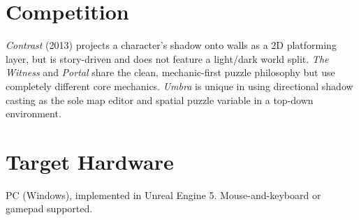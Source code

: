 \documentclass[11pt, letterpaper]{article}
\begin{document}
\section*{Competition}

\textit{Contrast} (2013) projects a character's shadow onto walls as a 2D platforming layer, but
is story-driven and does not feature a light/dark world split. \textit{The Witness} and
\textit{Portal} share the clean, mechanic-first puzzle philosophy but use completely different
core mechanics. \textit{Umbra} is unique in using directional shadow casting as the sole map
editor and spatial puzzle variable in a top-down environment.

\section*{Target Hardware}

PC (Windows), implemented in Unreal Engine 5. Mouse-and-keyboard or gamepad supported.
\end{document}
